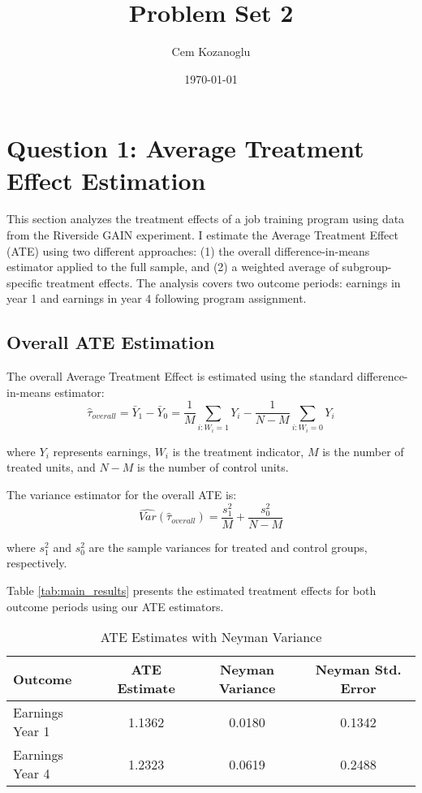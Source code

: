 \documentclass[12pt]{article}
\title{Problem Set 2}
\author{Cem Kozanoglu}
\date{\today}
\begin{document}
\maketitle

\section{Question 1: Average Treatment Effect Estimation}

This section analyzes the treatment effects of a job training program using data from the Riverside GAIN experiment. I estimate the Average Treatment Effect (ATE) using two different approaches: (1) the overall difference-in-means estimator applied to the full sample, and (2) a weighted average of subgroup-specific treatment effects. The analysis covers two outcome periods: earnings in year 1 and earnings in year 4 following program assignment.


\subsection{Overall ATE Estimation}
The overall Average Treatment Effect is estimated using the standard difference-in-means estimator:
$$\hat{\tau}_{overall} = \bar{Y}_1 - \bar{Y}_0 = \frac{1}{M}\sum_{i:W_i=1} Y_i - \frac{1}{N-M}\sum_{i:W_i=0} Y_i$$

where $Y_i$ represents earnings, $W_i$ is the treatment indicator, $M$ is the number of treated units, and $N-M$ is the number of control units.

The variance estimator for the overall ATE is:
$$\widehat{Var}(\hat{\tau}_{overall}) = \frac{s_1^2}{M} + \frac{s_0^2}{N-M}$$

where $s_1^2$ and $s_0^2$ are the sample variances for treated and control groups, respectively.

Table \ref{tab:main_results} presents the estimated treatment effects for both outcome periods using our ATE estimators.

\begin{table}[h]
\centering
\caption{ATE Estimates with Neyman Variance}
\label{tab:main_results_neyman}
\begin{tabular}{lccc}
\hline
\textbf{Outcome} & \textbf{ATE Estimate} & \textbf{Neyman Variance} & \textbf{Neyman Std. Error} \\
\hline
Earnings Year 1 & 1.1362 & 0.0180 & 0.1342 \\
Earnings Year 4 & 1.2323 & 0.0619 & 0.2488 \\
\hline
\end{tabular}
\end{table}
\end{document}

